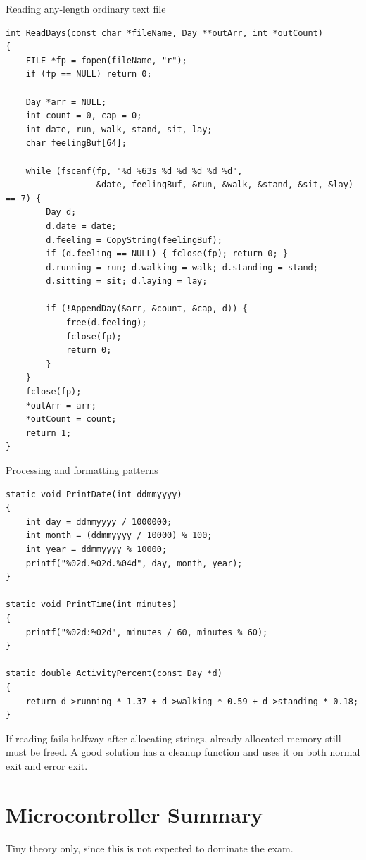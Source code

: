 \documentclass[9pt,a4paper]{article}
\begin{document}
\begin{codebox}{Reading any-length ordinary text file}
\begin{lstlisting}[style=cstyle]
int ReadDays(const char *fileName, Day **outArr, int *outCount)
{
    FILE *fp = fopen(fileName, "r");
    if (fp == NULL) return 0;

    Day *arr = NULL;
    int count = 0, cap = 0;
    int date, run, walk, stand, sit, lay;
    char feelingBuf[64];

    while (fscanf(fp, "%d %63s %d %d %d %d %d",
                  &date, feelingBuf, &run, &walk, &stand, &sit, &lay) == 7) {
        Day d;
        d.date = date;
        d.feeling = CopyString(feelingBuf);
        if (d.feeling == NULL) { fclose(fp); return 0; }
        d.running = run; d.walking = walk; d.standing = stand;
        d.sitting = sit; d.laying = lay;

        if (!AppendDay(&arr, &count, &cap, d)) {
            free(d.feeling);
            fclose(fp);
            return 0;
        }
    }
    fclose(fp);
    *outArr = arr;
    *outCount = count;
    return 1;
}
\end{lstlisting}
\end{codebox}

\begin{codebox}{Processing and formatting patterns}
\begin{lstlisting}[style=cstyle]
static void PrintDate(int ddmmyyyy)
{
    int day = ddmmyyyy / 1000000;
    int month = (ddmmyyyy / 10000) % 100;
    int year = ddmmyyyy % 10000;
    printf("%02d.%02d.%04d", day, month, year);
}

static void PrintTime(int minutes)
{
    printf("%02d:%02d", minutes / 60, minutes % 60);
}

static double ActivityPercent(const Day *d)
{
    return d->running * 1.37 + d->walking * 0.59 + d->standing * 0.18;
}
\end{lstlisting}
\end{codebox}

\begin{danger}
If reading fails halfway after allocating strings, already allocated memory still must be freed. A good solution has a cleanup function and uses it on both normal exit and error exit.
\end{danger}

\section{Microcontroller Summary}
\begin{idea}
Tiny theory only, since this is not expected to dominate the exam.
\end{idea}
\end{document}
